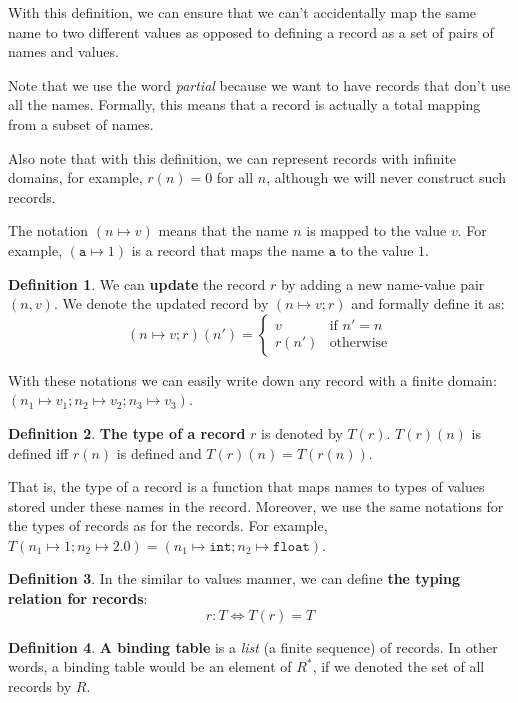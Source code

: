 \documentclass[14pt]{constructor-thesis}
\theoremstyle{definition}
\newtheorem*{definition}{Definition}
\begin{document}
With this definition, we can ensure that we can't accidentally map the same name to two different values as opposed to defining a record as a set of pairs of names and values.

Note that we use the word \textit{partial} because we want to have records that don't use all the names. Formally, this means that a record is actually a total mapping from a subset of names.

Also note that with this definition, we can represent records with infinite domains, for example, $r(n) = 0$ for all $n$, although we will never construct such records.

The notation $(n \mapsto v)$ means that the name $n$ is mapped to the value $v$. For example, $(\mathtt{a} \mapsto 1)$ is a record that maps the name $\mathtt{a}$ to the value $1$.

\begin{definition}
  We can \textbf{update} the record $r$ by adding a new name-value pair $(n, v)$. We denote the updated record by $(n \mapsto v; r)$ and formally define it as:
  $$
  (n \mapsto v; r)(n') = \begin{cases}
    v & \text{if } n' = n \\
    r(n') & \text{otherwise}
  \end{cases}
  $$
\end{definition}

With these notations we can easily write down any record with a finite domain: $(n_1 \mapsto v_1; n_2 \mapsto v_2; n_3 \mapsto v_3)$.

\begin{definition}
  \textbf{The type of a record} $r$ is denoted by $T(r)$. $T(r)(n)$ is defined iff $r(n)$ is defined and $T(r)(n) = T(r(n))$.
\end{definition}

That is, the type of a record is a function that maps names to types of values stored under these names in the record. Moreover, we use the same notations for the types of records as for the records. For example, $T(n_1 \mapsto 1; n_2 \mapsto 2.0) = (n_1 \mapsto \mathtt{int}; n_2 \mapsto \mathtt{float})$.

\begin{definition}
  In the similar to values manner, we can define \textbf{the typing relation for records}:
  $$ r : T \Longleftrightarrow T(r) = T $$
\end{definition}

\begin{definition}
  \textbf{A binding table} is a \textit{list} (a finite sequence) of records. In other words, a binding table would be an element of $R^*$, if we denoted the set of all records by $R$.
\end{definition}
\end{document}
